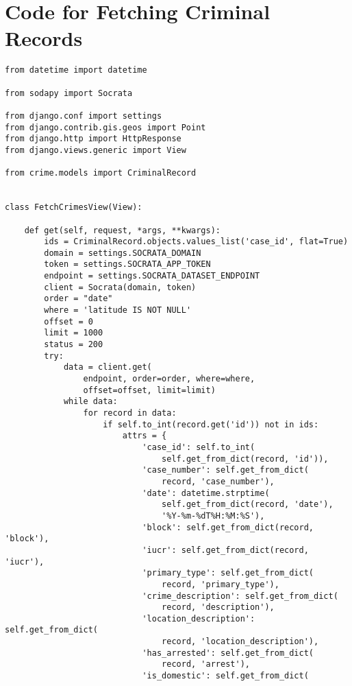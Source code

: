 \chapter{Code for Fetching Criminal Records} \label{code-fetchcrimes}
\begin{small}
\begin{verbatim}
from datetime import datetime

from sodapy import Socrata

from django.conf import settings
from django.contrib.gis.geos import Point
from django.http import HttpResponse
from django.views.generic import View

from crime.models import CriminalRecord


class FetchCrimesView(View):

    def get(self, request, *args, **kwargs):
        ids = CriminalRecord.objects.values_list('case_id', flat=True)
        domain = settings.SOCRATA_DOMAIN
        token = settings.SOCRATA_APP_TOKEN
        endpoint = settings.SOCRATA_DATASET_ENDPOINT
        client = Socrata(domain, token)
        order = "date"
        where = 'latitude IS NOT NULL'
        offset = 0
        limit = 1000
        status = 200
        try:
            data = client.get(
                endpoint, order=order, where=where,
                offset=offset, limit=limit)
            while data:
                for record in data:
                    if self.to_int(record.get('id')) not in ids:
                        attrs = {
                            'case_id': self.to_int(
                                self.get_from_dict(record, 'id')),
                            'case_number': self.get_from_dict(
                                record, 'case_number'),
                            'date': datetime.strptime(
                                self.get_from_dict(record, 'date'),
                                '%Y-%m-%dT%H:%M:%S'),
                            'block': self.get_from_dict(record, 'block'),
                            'iucr': self.get_from_dict(record, 'iucr'),
                            'primary_type': self.get_from_dict(
                                record, 'primary_type'),
                            'crime_description': self.get_from_dict(
                                record, 'description'),
                            'location_description': self.get_from_dict(
                                record, 'location_description'),
                            'has_arrested': self.get_from_dict(
                                record, 'arrest'),
                            'is_domestic': self.get_from_dict(

\end{verbatim}
\end{small}

